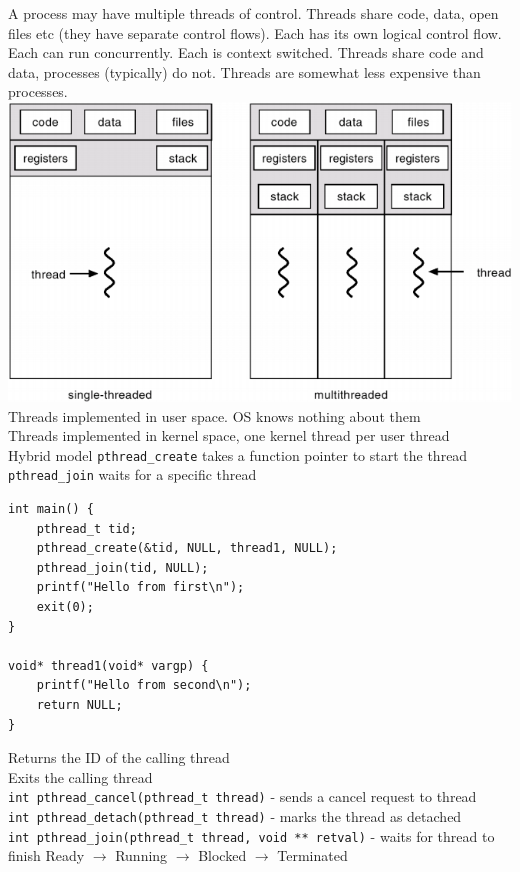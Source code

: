 \documentclass[number]{notes}
\begin{document}
\begin{landscape}
\begin{multicols}{3}
A process may have multiple threads of control. Threads share code, data, open files etc (they have separate control flows).
Each has its own logical control flow. Each can run concurrently. Each is context switched.
Threads share code and data, processes (typically) do not. Threads are somewhat less expensive than processes.
\includegraphics[width=\linewidth]{singlevsmulti.png}
Threads implemented in user space. OS knows nothing about them\\
Threads implemented in kernel space, one kernel thread per user thread\\
Hybrid model
\texttt{pthread\_create} takes a function pointer to start the thread\\
\texttt{pthread\_join} waits for a specific thread
\begin{lstlisting}
int main() {
    pthread_t tid;
    pthread_create(&tid, NULL, thread1, NULL);
    pthread_join(tid, NULL);
    printf("Hello from first\n");
    exit(0);
}

void* thread1(void* vargp) {
    printf("Hello from second\n");
    return NULL;
}
\end{lstlisting}
Returns the ID of the calling thread\\
Exits the calling thread\\
\texttt{int pthread\_cancel(pthread\_t thread)} - sends a cancel request to thread\\
\texttt{int pthread\_detach(pthread\_t thread)} - marks the thread as detached\\
\texttt{int pthread\_join(pthread\_t thread, void ** retval)} - waits for thread to finish
Ready $\rightarrow$ Running $\rightarrow$ Blocked $\rightarrow$ Terminated


\end{multicols}
\end{landscape}
\end{document}
